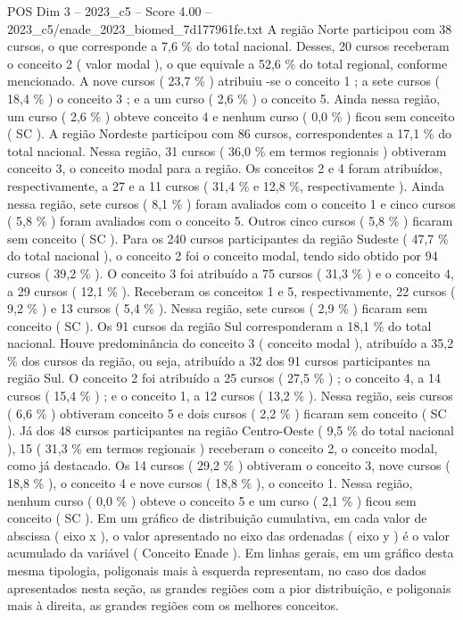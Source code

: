 \begin{textsample}{POS Dim 3 – 2023\_c5 – Score 4.00 – 2023\_c5/enade\_2023\_biomed\_7d177961fe.txt}
A região Norte participou com 38 cursos, o que corresponde a 7,6 \% do total nacional.
Desses, 20 cursos receberam o conceito 2 ( valor modal ), o que equivale a 52,6 \% do total regional, conforme mencionado.
A nove cursos ( 23,7 \% ) atribuiu -se o conceito 1 ; a sete cursos ( 18,4 \% ) o conceito 3 ; e a um curso ( 2,6 \% ) o conceito 5.
Ainda nessa região, um curso ( 2,6 \% ) obteve conceito 4 e nenhum curso ( 0,0 \% ) ficou sem conceito ( SC ).
A região Nordeste participou com 86 cursos, correspondentes a 17,1 \% do total nacional.
Nessa região, 31 cursos ( 36,0 \% em termos regionais ) obtiveram conceito 3, o conceito modal para a região.
Os conceitos 2 e 4 foram atribuídos, respectivamente, a 27 e a 11 cursos ( 31,4 \% e 12,8 \%, respectivamente ).
Ainda nessa região, sete cursos ( 8,1 \% ) foram avaliados com o conceito 1 e cinco cursos ( 5,8 \% ) foram avaliados com o conceito 5.
Outros cinco cursos ( 5,8 \% ) ficaram sem conceito ( SC ).
Para os 240 cursos participantes da região Sudeste ( 47,7 \% do total nacional ), o conceito 2 foi o conceito modal, tendo sido obtido por 94 cursos ( 39,2 \% ).
O conceito 3 foi atribuído a 75 cursos ( 31,3 \% ) e o conceito 4, a 29 cursos ( 12,1 \% ).
Receberam os conceitos 1 e 5, respectivamente, 22 cursos ( 9,2 \% ) e 13 cursos ( 5,4 \% ).
Nessa região, sete cursos ( 2,9 \% ) ficaram sem conceito ( SC ).
Os 91 cursos da região Sul corresponderam a 18,1 \% do total nacional.
Houve predominância do conceito 3 ( conceito modal ), atribuído a 35,2 \% dos cursos da região, ou seja, atribuído a 32 dos 91 cursos participantes na região Sul.
O conceito 2 foi atribuído a 25 cursos ( 27,5 \% ) ; o conceito 4, a 14 cursos ( 15,4 \% ) ; e o conceito 1, a 12 cursos ( 13,2 \% ).
Nessa região, seis cursos ( 6,6 \% ) obtiveram conceito 5 e dois cursos ( 2,2 \% ) ficaram sem conceito ( SC ).
Já dos 48 cursos participantes na região Centro-Oeste ( 9,5 \% do total nacional ), 15 ( 31,3 \% em termos regionais ) receberam o conceito 2, o conceito modal, como já destacado.
Os 14 cursos ( 29,2 \% ) obtiveram o conceito 3, nove cursos ( 18,8 \% ), o conceito 4 e nove cursos ( 18,8 \% ), o conceito 1.
Nessa região, nenhum curso ( 0,0 \% ) obteve o conceito 5 e um curso ( 2,1 \% ) ficou sem conceito ( SC ).
Em um gráfico de distribuição cumulativa, em cada valor de abscissa ( eixo x ), o valor apresentado no eixo das ordenadas ( eixo y ) é o valor acumulado da variável ( Conceito Enade ).
Em linhas gerais, em um gráfico desta mesma tipologia, poligonais mais à esquerda representam, no caso dos dados apresentados nesta seção, as grandes regiões com a pior distribuição, e poligonais mais à direita, as grandes regiões com os melhores conceitos.

\end{textsample}
